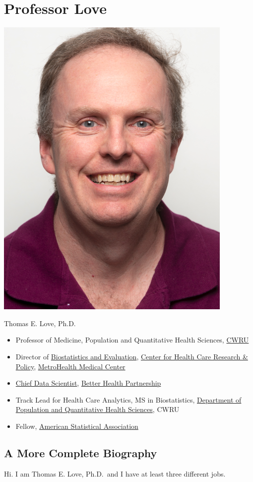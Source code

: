\documentclass[
]{book}
\providecommand{\tightlist}{%
  \setlength{\itemsep}{0pt}\setlength{\parskip}{0pt}}
\begin{document}
\hypertarget{professor-love}{%
\chapter{Professor Love}\label{professor-love}}

\includegraphics[width=0.3\linewidth]{images/Thomas_Love}

Thomas E. Love, Ph.D.

\begin{itemize}
\tightlist
\item
  Professor of Medicine, Population and Quantitative Health Sciences, \href{http://case.edu/}{CWRU}
\item
  Director of \href{http://chrp.org/biostatistics-evaluation/}{Biostatistics and Evaluation}, \href{http://chrp.org/}{Center for Health Care Research \& Policy}, \href{https://www.metrohealth.org/research}{MetroHealth Medical Center}
\item
  \href{http://www.betterhealthpartnership.org/data_center/}{Chief Data Scientist}, \href{http://betterhealthpartnership.org/}{Better Health Partnership}
\item
  Track Lead for Health Care Analytics, MS in Biostatistics, \href{http://epbiwww.case.edu/}{Department of Population and Quantitative Health Sciences}, CWRU
\item
  Fellow, \href{http://www.amstat.org/}{American Statistical Association}
\end{itemize}

\hypertarget{a-more-complete-biography}{%
\section{A More Complete Biography}\label{a-more-complete-biography}}

Hi. I am Thomas E. Love, Ph.D.~and I have at least three different jobs.
\end{document}
